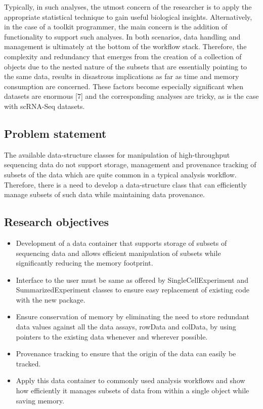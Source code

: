 \documentclass[
]{article}
\providecommand{\tightlist}{%
  \setlength{\itemsep}{0pt}\setlength{\parskip}{0pt}}
\begin{document}
Typically, in such analyses, the utmost concern of the researcher is to
apply the appropriate statistical technique to gain useful biological
insights. Alternatively, in the case of a toolkit programmer, the main
concern is the addition of functionality to support such analyses. In
both scenarios, data handling and management is ultimately at the bottom
of the workflow stack. Therefore, the complexity and redundancy that
emerges from the creation of a collection of objects due to the nested
nature of the subsets that are essentially pointing to the same data,
results in disastrous implications as far as time and memory consumption
are concerned. These factors become especially significant when datasets
are enormous {[}7{]} and the corresponding analyses are tricky, as is
the case with scRNA-Seq datasets.

\hypertarget{problem-statement}{%
\subsection{Problem statement}\label{problem-statement}}

The available data-structure classes for manipulation of high-throughput
sequencing data do not support storage, management and provenance
tracking of subsets of the data which are quite common in a typical
analysis workflow. Therefore, there is a need to develop a
data-structure class that can efficiently manage subsets of such data
while maintaining data provenance.

\hypertarget{research-objectives}{%
\subsection{Research objectives}\label{research-objectives}}

\begin{itemize}
\tightlist
\item
  Development of a data container that supports storage of subsets of
  sequencing data and allows efficient manipulation of subsets while
  significantly reducing the memory footprint.
\item
  Interface to the user must be same as offered by SingleCellExperiment
  and SummarizedExperiment classes to ensure easy replacement of
  existing code with the new package.
\item
  Ensure conservation of memory by eliminating the need to store
  redundant data values against all the data assays, rowData and
  colData, by using pointers to the existing data whenever and wherever
  possible.
\item
  Provenance tracking to ensure that the origin of the data can easily
  be tracked.
\item
  Apply this data container to commonly used analysis workflows and show
  how efficiently it manages subsets of data from within a single object
  while saving memory.
\end{itemize}
\end{document}
